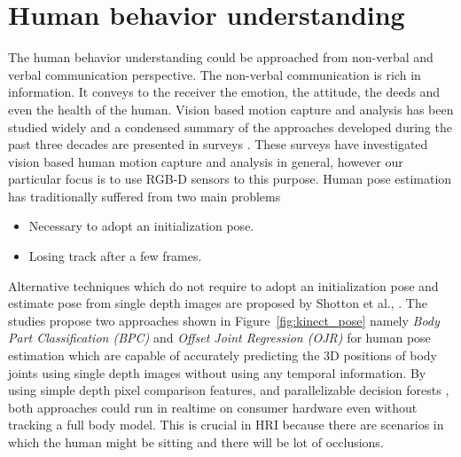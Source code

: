 \section{Human behavior understanding} %
The human behavior understanding could be approached from non-verbal and verbal communication perspective. The non-verbal communication is rich in information. It conveys to the receiver the emotion, the attitude, the deeds and even the health of the human. Vision based motion capture and analysis has been studied widely and a condensed summary of the approaches developed during the past three decades are presented in surveys \cite{Moeslund2001231}\cite{Moeslund200690}\cite{Poppe20074}. These surveys have investigated vision based human motion capture and analysis in general, however our particular focus is to use RGB-D sensors to this purpose. Human pose estimation has traditionally suffered from two main problems
\begin{itemize}
\item Necessary to adopt an initialization pose.
\item Losing track after a few frames.
\end{itemize}
Alternative techniques which do not require to adopt an initialization pose and estimate pose from single depth images are proposed by Shotton et al., \cite{shotton2013real} \cite{shotton2013efficient}. The studies propose two approaches shown in Figure~\ref{fig:kinect_pose} namely \emph{Body Part Classification (BPC)} and \emph{Offset Joint Regression (OJR)} for human pose estimation which are capable of accurately predicting the 3D positions of body joints using single depth images without using any temporal information. By using simple depth pixel comparison features, and parallelizable decision forests \cite{breiman2001random}, both approaches could run in realtime on consumer hardware even without tracking a full body model. This is crucial in HRI because there are scenarios in which the human might be sitting and there will be lot of occlusions. 
